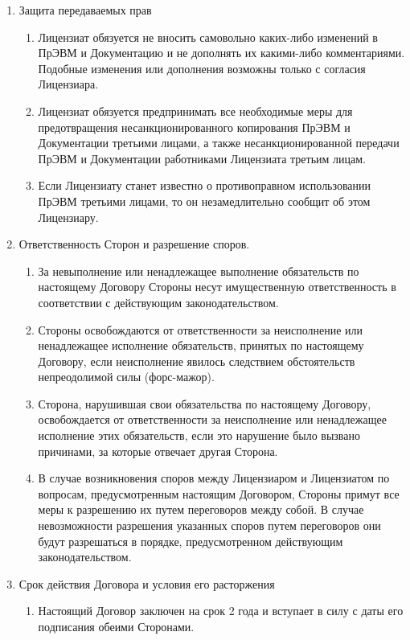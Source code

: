 \begin{enumerate}
    \item Защита передаваемых прав
    \begin{enumerate}
        \item Лицензиат обязуется не вносить самовольно каких-либо изменений в ПрЭВМ и Документацию и не дополнять их какими-либо комментариями. Подобные изменения или дополнения возможны только с согласия Лицензиара.
        \item Лицензиат обязуется предпринимать все необходимые меры для предотвращения несанкционированного копирования ПрЭВМ и Документации третьими лицами, а также несанкционированной передачи ПрЭВМ и Документации работниками Лицензиата третьим лицам.
        \item Если Лицензиату станет известно о противоправном использовании ПрЭВМ третьими лицами, то он незамедлительно сообщит об этом Лицензиару.
    \end{enumerate}
    \item Ответственность Сторон и разрешение споров.
    \begin{enumerate}
        \item За невыполнение или ненадлежащее выполнение обязательств по настоящему Договору Стороны несут имущественную ответственность в соответствии с действующим законодательством.
        \item Стороны освобождаются от ответственности за неисполнение или ненадлежащее исполнение обязательств, принятых по настоящему Договору, если неисполнение явилось следствием обстоятельств непреодолимой силы (форс-мажор).
        \item Сторона, нарушившая свои обязательства по настоящему Договору, освобождается от ответственности за неисполнение или ненадлежащее исполнение этих обязательств, если это нарушение было вызвано причинами, за которые отвечает другая Сторона.
        \item В случае возникновения споров между Лицензиаром и Лицензиатом по вопросам, предусмотренным настоящим Договором, Стороны примут все меры к разрешению их путем переговоров между собой. В случае невозможности разрешения указанных споров путем переговоров они будут разрешаться в порядке, предусмотренном действующим законодательством.
    \end{enumerate}
    \item Срок действия Договора и условия его расторжения
    \begin{enumerate}
        \item Настоящий Договор заключен на срок 2 года и вступает в силу с даты его подписания обеими Сторонами.

\end{enumerate}
\end{enumerate}
